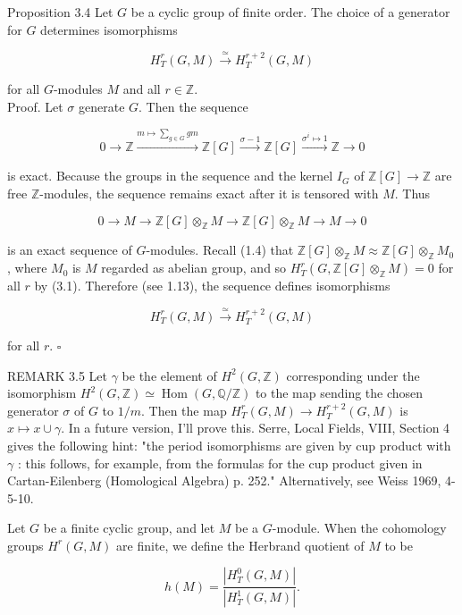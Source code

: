 \documentclass[10pt]{article}
\begin{document}
Proposition 3.4 Let $G$ be a cyclic group of finite order. The choice of a generator for $G$ determines isomorphisms

$$
H_{T}^{r}(G, M) \xrightarrow{\simeq} H_{T}^{r+2}(G, M)
$$

for all $G$-modules $M$ and all $r \in \mathbb{Z}$.\\
Proof. Let $\sigma$ generate $G$. Then the sequence

$$
0 \rightarrow \mathbb{Z} \xrightarrow{m \mapsto \sum_{g \in G} g m} \mathbb{Z}[G] \xrightarrow{\sigma-1} \mathbb{Z}[G] \xrightarrow{\sigma^{i} \mapsto 1} \mathbb{Z} \rightarrow 0
$$

is exact. Because the groups in the sequence and the kernel $I_{G}$ of $\mathbb{Z}[G] \rightarrow \mathbb{Z}$ are free $\mathbb{Z}$-modules, the sequence remains exact after it is tensored with $M$. Thus

$$
0 \rightarrow M \rightarrow \mathbb{Z}[G] \otimes_{\mathbb{Z}} M \rightarrow \mathbb{Z}[G] \otimes_{\mathbb{Z}} M \rightarrow M \rightarrow 0
$$

is an exact sequence of $G$-modules. Recall (1.4) that $\mathbb{Z}[G] \otimes_{\mathbb{Z}} M \approx \mathbb{Z}[G] \otimes_{\mathbb{Z}} M_{0}$, where $M_{0}$ is $M$ regarded as abelian group, and so $H_{T}^{r}\left(G, \mathbb{Z}[G] \otimes_{\mathbb{Z}} M\right)=0$ for all $r$ by (3.1). Therefore (see 1.13), the sequence defines isomorphisms

$$
H_{T}^{r}(G, M) \xrightarrow{\simeq} H_{T}^{r+2}(G, M)
$$

for all $r$. \(\square\)

REMARK 3.5 Let $\gamma$ be the element of $H^{2}(G, \mathbb{Z})$ corresponding under the isomorphism $H^{2}(G, \mathbb{Z}) \simeq \operatorname{Hom}(G, \mathbb{Q} / \mathbb{Z})$ to the map sending the chosen generator $\sigma$ of $G$ to $1 / m$. Then the map $H_{T}^{r}(G, M) \rightarrow H_{T}^{r+2}(G, M)$ is $x \mapsto x \cup \gamma$. In a future version, I'll prove this. Serre, Local Fields, VIII, Section 4 gives the following hint: "the period isomorphisms are given by cup product with $\gamma$ : this follows, for example, from the formulas for the cup product given in Cartan-Eilenberg (Homological Algebra) p. 252." Alternatively, see Weiss 1969, 4-5-10.

Let $G$ be a finite cyclic group, and let $M$ be a $G$-module. When the cohomology groups $H^{r}(G, M)$ are finite, we define the Herbrand quotient of $M$ to be

$$
h(M)=\frac{\left|H_{T}^{0}(G, M)\right|}{\left|H_{T}^{1}(G, M)\right|} .
$$
\end{document}
